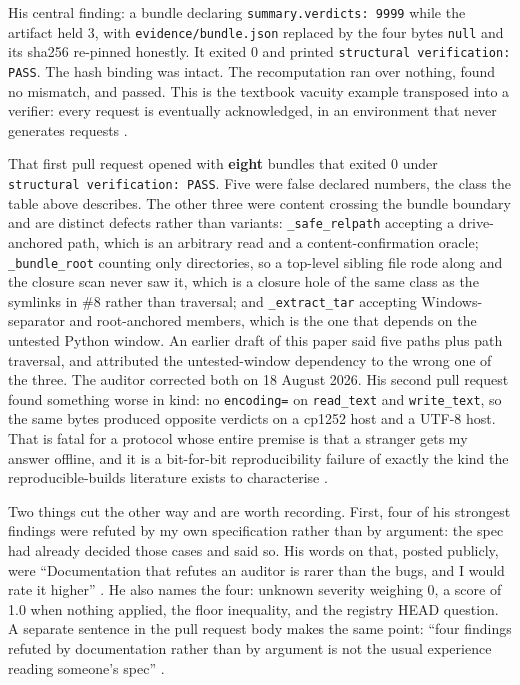 \documentclass[11pt]{article}
\begin{document}
His central finding: a bundle declaring \texttt{summary.verdicts: 9999} while the artifact
held 3, with \texttt{evidence/bundle.json} replaced by the four bytes \texttt{null} and its
sha256 re-pinned honestly. It exited 0 and printed \texttt{structural verification: PASS}.
The hash binding was intact. The recomputation ran over nothing, found no mismatch, and
passed. This is the textbook vacuity example transposed into a verifier: every request is
eventually acknowledged, in an environment that never generates requests
\citep{simmonds2010vacuity}.

That first pull request opened with \textbf{eight} bundles that exited 0 under
\texttt{structural verification: PASS}. Five were false declared numbers, the class the table
above describes. The other three were content crossing the bundle boundary and are distinct
defects rather than variants: \texttt{\_safe\_relpath} accepting a drive-anchored path, which
is an arbitrary read and a content-confirmation oracle; \texttt{\_bundle\_root} counting only
directories, so a top-level sibling file rode along and the closure scan never saw it, which is
a closure hole of the same class as the symlinks in \#8 rather than traversal; and
\texttt{\_extract\_tar} accepting Windows-separator and root-anchored members, which is the one
that depends on the untested Python window. An earlier draft of this paper said five paths plus
path traversal, and attributed the untested-window dependency to the wrong one of the three. The
auditor corrected both on 18 August 2026. His second pull request found something worse in kind: no \texttt{encoding=} on
\texttt{read\_text} and \texttt{write\_text}, so the same bytes produced opposite verdicts
on a cp1252 host and a UTF-8 host. That is fatal for a protocol whose entire premise is that
a stranger gets my answer offline, and it is a bit-for-bit reproducibility failure of
exactly the kind the reproducible-builds literature exists to characterise
\citep{lamb2022reproducible,fourne2023flossing}.

Two things cut the other way and are worth recording. First, four of his strongest findings
were refuted by my own specification rather than by argument: the spec had already decided
those cases and said so. His words on that, posted publicly, were
``Documentation that refutes an auditor is rarer than the bugs, and I would rate it higher''
\citep{derme2026devto}. He also names the four: unknown severity weighing 0, a score of 1.0
when nothing applied, the floor inequality, and the registry HEAD question. A separate sentence
in the pull request body makes the same point: ``four findings refuted by documentation rather
than by argument is not the usual experience reading someone's spec'' \citep{derme2026pr1}.
\end{document}
